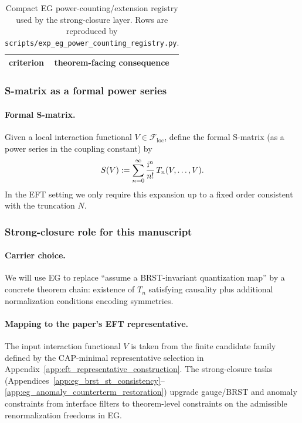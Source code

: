 \begin{table}[H]
\centering
\small
\setlength{\tabcolsep}{10pt}
\renewcommand{\arraystretch}{1.15}
\begin{tabular}{p{5.2cm} p{8.0cm}}
\toprule
criterion & theorem-facing consequence \\
\midrule
%
\end{tabular}
\caption{Compact EG power-counting/extension registry used by the strong-closure layer. Rows are reproduced by \texttt{scripts/exp\_eg\_power\_counting\_registry.py}.}
\label{tab:eg_power_counting_registry}
\end{table}

\subsubsection{S-matrix as a formal power series}
\paragraph{Formal S-matrix.}
Given a local interaction functional $V\in\mathcal{F}_{\mathrm{loc}}$, define the formal S-matrix (as a power series in the coupling constant) by
\[
S(V):=\sum_{n=0}^{\infty}\frac{\mathrm{i}^n}{n!}\,T_n(V,\ldots,V).
\]
In the EFT setting we only require this expansion up to a fixed order consistent with the truncation $N$.

\subsubsection{Strong-closure role for this manuscript}
\paragraph{Carrier choice.}
\MathTag We will use EG to replace ``assume a BRST-invariant quantization map'' by a concrete theorem chain: existence of $T_n$ satisfying causality plus additional normalization conditions encoding symmetries.

\paragraph{Mapping to the paper's EFT representative.}
\InterfaceTag The input interaction functional $V$ is taken from the finite candidate family defined by the CAP-minimal representative selection in Appendix~\ref{app:eft_representative_construction}.
The strong-closure tasks (Appendices~\ref{app:eg_brst_st_consistency}--\ref{app:eg_anomaly_counterterm_restoration}) upgrade gauge/BRST and anomaly constraints from interface filters to theorem-level constraints on the admissible renormalization freedoms in EG.

